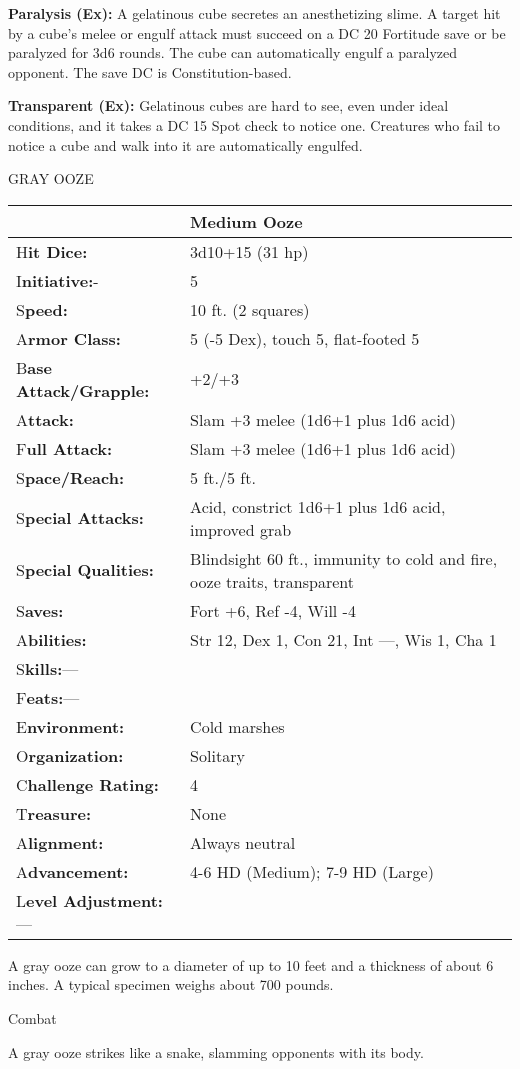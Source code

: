 \documentclass{article}
\begin{document}
\textbf{Paralysis (Ex): }A gelatinous cube secretes an anesthetizing slime. A target 
hit by a cube's melee or engulf attack must succeed on a DC 20 Fortitude save or 
be paralyzed for 3d6 rounds. The cube can automatically engulf a paralyzed opponent. 
The save DC is Constitution-based.

\textbf{Transparent (Ex):} Gelatinous cubes are hard to see, even under ideal conditions, 
and it takes a DC 15 Spot check to notice one. Creatures who fail to notice a cube 
and walk into it are automatically engulfed.

\vspace{12pt}
GRAY OOZE

\begin{tabular}{|>{\raggedright}p{83pt}|>{\raggedright}p{242pt}|}
\hline
  & Medium Ooze\tabularnewline
\hline
H\textbf{it Dice:} & 3d10+15 (31 hp)\tabularnewline
\hline
I\textbf{nitiative:}- & 5\tabularnewline
\hline
S\textbf{peed:} & 10 ft. (2 squares)\tabularnewline
\hline
A\textbf{rmor Class:} & 5 (-5 Dex), touch 5, flat-footed 5\tabularnewline
\hline
B\textbf{ase Attack/Grapple:} & +2/+3\tabularnewline
\hline
A\textbf{ttack:} & Slam +3 melee (1d6+1 plus 1d6 acid)\tabularnewline
\hline
F\textbf{ull Attack:} & Slam +3 melee (1d6+1 plus 1d6 acid)\tabularnewline
\hline
S\textbf{pace/Reach:} & 5 ft./5 ft.\tabularnewline
\hline
S\textbf{pecial Attacks:} & Acid, constrict 1d6+1 plus 1d6 acid, improved grab\tabularnewline
\hline
S\textbf{pecial Qualities:} & Blindsight 60 ft., immunity to cold and fire, ooze 
traits, transparent\tabularnewline
\hline
S\textbf{aves:} & Fort +6, Ref -4, Will -4\tabularnewline
\hline
A\textbf{bilities:} & Str 12, Dex 1, Con 21, Int ---, Wis 1, Cha 1\tabularnewline
\hline
S\textbf{kills:}--- & \tabularnewline
\hline
F\textbf{eats:}--- & \tabularnewline
\hline
E\textbf{nvironment:} & Cold marshes\tabularnewline
\hline
O\textbf{rganization:} & Solitary\tabularnewline
\hline
C\textbf{hallenge Rating:} & 4\tabularnewline
\hline
T\textbf{reasure:} & None\tabularnewline
\hline
A\textbf{lignment:} & Always neutral\tabularnewline
\hline
A\textbf{dvancement:} & 4-6 HD (Medium); 7-9 HD (Large)\tabularnewline
\hline
L\textbf{evel Adjustment:}--- & \tabularnewline
\hline
\end{tabular}

A gray ooze can grow to a diameter of up to 10 feet and a thickness of about 6 
inches. A typical specimen weighs about 700 pounds.

Combat

A gray ooze strikes like a snake, slamming opponents with its body.
\end{document}

